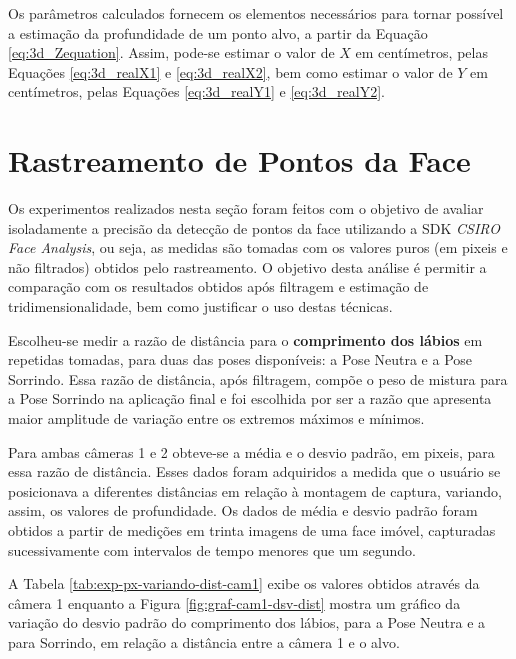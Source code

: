 Os parâmetros calculados fornecem os elementos necessários para tornar possível
a estimação da profundidade de um ponto alvo, a partir da Equação
\ref{eq:3d_Zequation}. Assim, pode-se estimar o valor de $X$ em centímetros,
pelas Equações \ref{eq:3d_realX1} e \ref{eq:3d_realX2}, bem como estimar o valor
de $Y$ em centímetros, pelas Equações \ref{eq:3d_realY1} e \ref{eq:3d_realY2}.

\section{Rastreamento de Pontos da Face}

Os experimentos realizados nesta seção foram feitos com o objetivo de avaliar
isoladamente a precisão da detecção de pontos da face utilizando a SDK
\textit{CSIRO Face Analysis}, ou seja, as medidas são tomadas com os valores
puros (em pixeis e não filtrados) obtidos pelo rastreamento. O objetivo desta
análise é permitir a comparação com os resultados obtidos após filtragem e
estimação de tridimensionalidade, bem como justificar o uso destas técnicas.


Escolheu-se medir a razão de distância para o \textbf{comprimento dos lábios} em
repetidas tomadas, para duas das poses disponíveis: a Pose Neutra e a Pose
Sorrindo. Essa razão de distância, após filtragem, compõe o peso de mistura para
a Pose Sorrindo na aplicação final e foi escolhida por ser a razão que apresenta
maior amplitude de variação entre os extremos máximos e mínimos.

Para ambas câmeras 1 e 2 obteve-se a média e o desvio padrão, em pixeis, para
essa razão de distância. Esses dados foram adquiridos a medida que o usuário se
posicionava a diferentes distâncias em relação à montagem de captura, variando,
assim, os valores de profundidade. Os dados de média e desvio padrão foram
obtidos a partir de medições em trinta imagens de uma face imóvel, capturadas
sucessivamente com intervalos de tempo menores que um segundo.

A Tabela \ref{tab:exp-px-variando-dist-cam1} exibe os valores obtidos através da
câmera 1 enquanto a Figura \ref{fig:graf-cam1-dsv-dist} mostra um gráfico da
variação do desvio padrão do comprimento dos lábios, para a Pose Neutra e a para
Sorrindo, em relação a distância entre a câmera 1 e o alvo.


